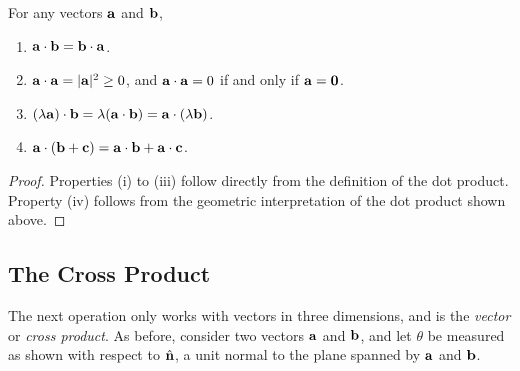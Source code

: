 \documentclass[a4paper]{scrartcl}
\begin{document}
  \begin{proposition}
      For any vectors $\mathbf{a}$ and $\mathbf{b}$,
      \begin{enumerate}[label=(\roman*)]
          \item $\mathbf{a} \cdot \mathbf{b} = \mathbf{b} \cdot \mathbf{a}$.
          \item $\mathbf{a} \cdot \mathbf{a} = |\mathbf{a}|^2 \geq 0$, and $\mathbf{a} \cdot \mathbf{a} = 0$ if and only if $\mathbf{a} = \mathbf{0}$.
          \item $(\lambda \mathbf{a}) \cdot \mathbf{b} = \lambda (\mathbf{a} \cdot \mathbf{b}) = \mathbf{a} \cdot (\lambda \mathbf{b})$.
          \item $\mathbf{a} \cdot (\mathbf{b} + \mathbf{c}) = \mathbf{a} \cdot \mathbf{b} + \mathbf{a} \cdot \mathbf{c}$. 
      \end{enumerate}
  \end{proposition}
  \begin{proof}
      Properties (i) to (iii) follow directly from the definition of the dot product. Property (iv) follows from the geometric interpretation of the dot product shown above. 
  \end{proof}



\subsection{The Cross Product}

The next operation only works with vectors in three dimensions, and is the \emph{vector} or \emph{cross product}. As before, consider two vectors $\mathbf{a}$ and $\mathbf{b}$, and let $\theta$ be measured as shown with respect to $\hat{\mathbf{n}}$, a unit normal to the plane spanned by $\mathbf{a}$ and $\mathbf{b}$.

\begin{center}
  \end{center}
\end{document}
